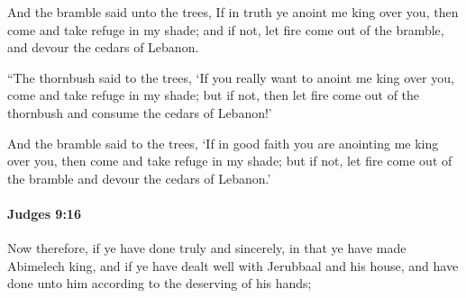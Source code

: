 			\begin{versebox}
					\item[BHS] 
					\item[ASV] And the bramble said unto the trees, If in truth ye anoint me king over you, then come and take refuge in my shade; and if not, let fire come out of the bramble, and devour the cedars of Lebanon.
					\item[NIV] “The thornbush said to the trees, ‘If you really want to anoint me king over you, come and take refuge in my shade; but if not, then let fire come out of the thornbush and consume the cedars of Lebanon!’
					\item[NRSV] And the bramble said to the trees, ‘If in good faith you are anointing me king over you, then come and take refuge in my shade; but if not, let fire come out of the bramble and devour the cedars of Lebanon.’
			\end{versebox}

		\paragraph{Judges 9:16} %
			\label{JUDGES-9-16}

			Now therefore, if ye have done truly and sincerely, in that ye have made Abimelech king, and if ye have dealt well with Jerubbaal and his house, and have done unto him according to the deserving of his hands;

